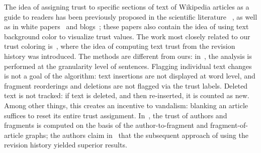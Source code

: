 The idea of assigning trust to specific sections of text of Wikipedia
articles as a guide to readers has been previously proposed in the scientific
literature~ \cite{WikiMTWtrust06,Cr06,McGuinness06}, as well as in white
papers~ \cite{King07} and blogs~\cite{PaoloMassa07}; these papers also contain
the idea of using text background color to visualize trust values.
The work most closely related to our trust coloring is~\cite{McGuinness06},
where the idea of computing text trust from the
revision history was introduced.
The methods are different from ours:
in~\cite{McGuinness06}, the analysis is performed at the granularity
level of sentences.
Flagging individual text changes is not a goal of the algorithm: text
insertions are not displayed at word level, and fragment reorderings
and deletions are not flagged via the trust labels.
Deleted text is not tracked: if text is deleted, and then re-inserted,
it is counted as new.
Among other things, this creates an incentive to vandalism:
blanking an article suffices to reset its entire trust assignment.
In~\cite{WikiMTWtrust06}, the trust of authors and fragments is
computed on the basis of the author-to-fragment and
fragment-of-article graphs; the authors claim in~\cite{McGuinness06}
that the subsequent approach of using the revision history yielded
superior results.

